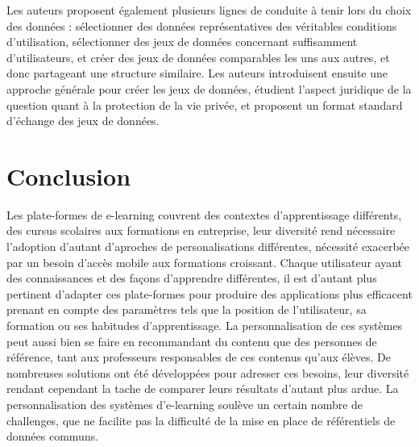 \documentclass[conference]{./sty/IEEEtran}
\begin{document}
Les auteurs proposent également plusieurs lignes de conduite à tenir lors du
choix des données : sélectionner des données représentatives des véritables
conditions d'utilisation, sélectionner des jeux de données concernant
suffisamment d'utilisateurs, et créer des jeux de données comparables les uns
aux autres, et donc partageant une structure similaire. Les auteurs
introduisent ensuite une approche générale pour créer les jeux de données,
étudient l'aspect juridique de la question quant à la protection de la vie
privée, et proposent un format standard d'échange des jeux de données.\\

\section{Conclusion}

Les plate-formes de e-learning couvrent des contextes d'apprentissage
différents, des cursus scolaires aux formations en entreprise, leur diversité
rend nécessaire l'adoption d'autant d'aproches de personalisations différentes,
nécessité exacerbée par un besoin d'accès mobile aux formations croissant.
Chaque utilisateur ayant des connaissances et des façons d'apprendre
différentes, il est d'autant plus pertinent d'adapter ces plate-formes pour
produire des applications plus efficacent prenant en compte des paramètres tels
que la position de l'utilisateur, sa formation ou ses habitudes
d'apprentissage.  La personnalisation de ces systèmes peut aussi bien se faire
en recommandant du contenu que des personnes de référence, tant aux professeurs
responsables de ces contenus qu'aux élèves. De nombreuses solutions ont été
développées pour adresser ces besoins, leur diversité rendant cependant la
tache de comparer leurs résultats d'autant plus ardue. La personnalisation des
systèmes d'e-learning soulève un certain nombre de challenges, que ne facilite
pas la difficulté de la mise en place de référentiels de données communs.




\end{document}
